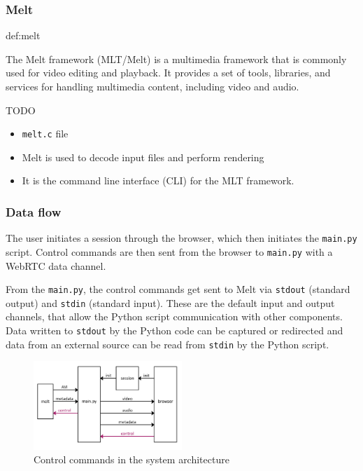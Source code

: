 \documentclass[../MasterThesis.tex]{subfiles}
\begin{document}
\subsubsection{Melt}

\begin{CountingDefinition}{def:melt}
	
	The Melt framework (MLT/Melt) is a multimedia framework that is commonly used for video editing and playback. It provides a set of tools, libraries, and services for handling multimedia content, including video and audio.~\cite{melt} 
	
\end{CountingDefinition}

TODO

\begin{itemize}
	\item \texttt{melt.c} file
	\item Melt is used to decode input files and perform rendering
	\item It is the command line interface (CLI) for the MLT framework.
\end{itemize}





\subsubsection{Data flow}

The user initiates a session through the browser, which then initiates the \texttt{main.py} script.
Control commands are then sent from the browser to \texttt{main.py} with a WebRTC data channel.

From the \texttt{main.py}, the control commands get sent to Melt via \texttt{stdout} (standard output) and \texttt{stdin} (standard input). These are the default input and output channels, that allow the Python script communication with other components.
Data written to \texttt{stdout} by the Python code can be captured or redirected and data from an external source can be read from \texttt{stdin} by the Python script. \cite{python}

\begin{figure}[H]
	\centering
	\includegraphics[width=0.5\textwidth]{IM_control.png}
	\caption{Control commands in the system architecture}
	
\end{figure}
\end{document}
